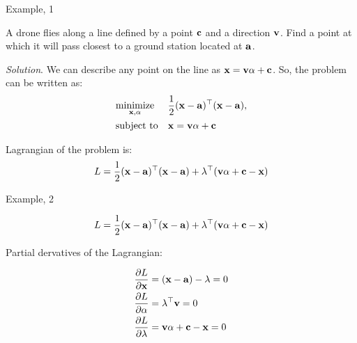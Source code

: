 \documentclass{beamer}
\begin{document}
\begin{frame}{Example, 1}
	\begin{flushleft}
		
		A drone flies along a line defined by a point $\mathbf{c}$ and a direction $\mathbf{v}$. Find a point at which it will pass closest to a ground station located at $\mathbf{a}$.
		
		\bigskip
		
		\emph{Solution}. We can describe any point on the line as $\mathbf{x} = \mathbf{v} \alpha + \mathbf{c}$. So, the problem can be written as:
		\begin{equation}
			\begin{aligned}
				& \underset{\mathbf{x}, \alpha}{\text{minimize}}
				& & \frac{1}{2}(\mathbf{x}- \mathbf{a})^\top(\mathbf{x}- \mathbf{a}), \\
				& \text{subject to}
				& & \mathbf{x} = \mathbf{v} \alpha + \mathbf{c}
			\end{aligned}
		\end{equation}
		
		Lagrangian of the problem is:
		\begin{equation}
			L =  \frac{1}{2}(\mathbf{x}- \mathbf{a})^\top(\mathbf{x}- \mathbf{a}) + \lambda^\top  ( \mathbf{v} \alpha + \mathbf{c} - \mathbf{x})
		\end{equation}
		
	
		
	\end{flushleft}
\end{frame}



\begin{frame}{Example, 2}
	\begin{flushleft}
		
		\begin{equation}
			L =  \frac{1}{2}(\mathbf{x}- \mathbf{a})^\top(\mathbf{x}- \mathbf{a}) + \lambda^\top ( \mathbf{v} \alpha + \mathbf{c} - \mathbf{x})
		\end{equation}
		
		Partial dervatives of the Lagrangian:
		
		\begin{align}
			\frac{\partial L}{\partial \mathbf{x}} &=  (\mathbf{x}- \mathbf{a}) - \lambda = 0
			\\
			\frac{\partial L}{\partial \alpha} &=  \lambda^\top \mathbf{v} = 0
			\\
			\frac{\partial L}{\partial  \lambda} &=   \mathbf{v} \alpha + \mathbf{c} - \mathbf{x} = 0
		\end{align}
		
		
	\end{flushleft}
\end{frame}
\end{document}
